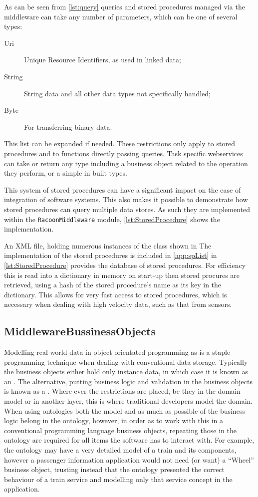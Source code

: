As can be seen from \autoref{lst:query} queries and stored procedures managed via the middleware can take any number of parameters, which can be one of several types:

\begin{description}
    \item[Uri]  Unique Resource Identifiers, as used in linked data;
    \item[String] String data and all other data types not specifically handled;    
    \item[Byte] For transferring binary data.
\end{description}

This list can be expanded if needed. These restrictions only apply to stored procedures and to functions directly passing queries. Task specific webservices can take or return any type including a business object related to the operation they perform, or a simple in built types.

This system of stored procedures can have a significant impact on the ease of integration of software systems. This also makes it possible to demonstrate how stored procedures can query multiple data stores. As such they are implemented within the  \texttt{RacoonMiddleware} module, \autoref{lst:StoredProcedure} shows the implementation.

An XML file, holding numerous instances of the class shown in The implementation of the stored procedures is included in \autoref{app:spList} in \autoref{lst:StoredProcedure} provides the database of stored procedures. For efficiency this is read into a dictionary in memory on start-up then stored procures are retrieved, using a hash of the stored procedure's name as its key in the dictionary. This allows for very fast access to stored procedures, which is necessary when dealing with high velocity data, such as that from sensors.

\subsection{MiddlewareBussinessObjects}
Modelling real world data in object orientated programming as  is a staple programming technique when dealing with conventional data storage. Typically the business objects either hold only instance data, in which case it is known as an . The alternative, putting business logic and validation in the business objects is known as a . Where ever the restrictions are placed, be they in the domain model or in another layer, this is where traditional developers model the domain. When using ontologies both the model and as much as possible of the business logic belong in the ontology, however, in order as to work with this in a conventional programming language business objects, repeating those in the ontology are required for all items the software has to interact with. For example, the ontology may have a very detailed model of a train and its components, however a passenger information application would not need (or want) a ``Wheel'' business object, trusting instead that the ontology presented the correct behaviour of a train service and modelling only that service concept in the application. 

